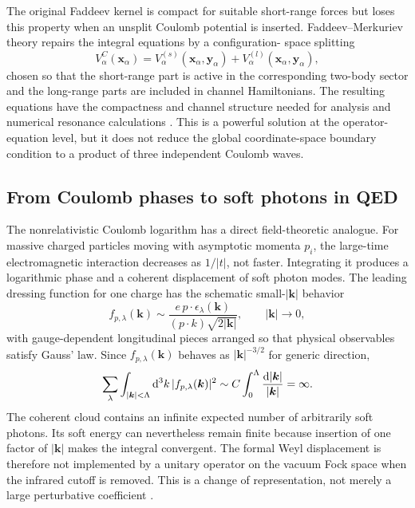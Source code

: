 The original Faddeev kernel is compact for suitable short-range forces but
loses this property when an unsplit Coulomb potential is inserted.
Faddeev--Merkuriev theory repairs the integral equations by a configuration-
space splitting
\begin{equation}
  V_\alpha^C(\bm x_\alpha)
  =V_\alpha^{(s)}(\bm x_\alpha,\bm y_\alpha)
  +V_\alpha^{(l)}(\bm x_\alpha,\bm y_\alpha),
  \label{eq:merkuriev-splitting}
\end{equation}
chosen so that the short-range part is active in the corresponding two-body
sector and the long-range parts are included in channel Hamiltonians.  The
resulting equations have the compactness and channel structure needed for
analysis and numerical resonance calculations
\cite{FaddeevMerkuriev:1993,Keller:2009FaddeevMerkuriev}.  This is a powerful
solution at the operator-equation level, but it does not reduce the global
coordinate-space boundary condition to a product of three independent
Coulomb waves.

\subsection{From Coulomb phases to soft photons in QED}
\label{subsec:qed-infrared}

The nonrelativistic Coulomb logarithm has a direct field-theoretic analogue.
For massive charged particles moving with asymptotic momenta $p_i$, the
large-time electromagnetic interaction decreases as $1/|t|$, not faster.
Integrating it produces a logarithmic phase and a coherent displacement of
soft photon modes.  The leading dressing function for one charge has the
schematic small-$|\bm k|$ behavior
\begin{equation}
  f_{p,\lambda}(\bm k)
  \sim
  \frac{e\,p\cdot\epsilon_\lambda(\bm k)}
  {(p\cdot k)\sqrt{2|\bm k|}},
  \qquad |\bm k|\to0 ,
  \label{eq:qed-soft-dressing}
\end{equation}
with gauge-dependent longitudinal pieces arranged so that physical
observables satisfy Gauss' law.  Since $f_{p,\lambda}(\bm k)$ behaves as
$|\bm k|^{-3/2}$ for generic direction,
\begin{equation}
  \sum_\lambda\int_{|\bm k|<\Lambda}
  \mathrm{d}^3k\,|f_{p,\lambda}(\bm k)|^2
  \sim C\int_0^\Lambda\frac{\mathrm{d}|\bm k|}{|\bm k|}
  =\infty .
  \label{eq:soft-photon-number-log}
\end{equation}
The coherent cloud contains an infinite expected number of arbitrarily soft
photons.  Its soft energy can nevertheless remain finite because insertion of
one factor of $|\bm k|$ makes the integral convergent.  The formal Weyl
displacement is therefore not implemented by a unitary operator on the
vacuum Fock space when the infrared cutoff is removed.  This is a change of
representation, not merely a large perturbative coefficient
\cite{BlochNordsieck:1937,Chung:1965,KulishFaddeev:1970}.

